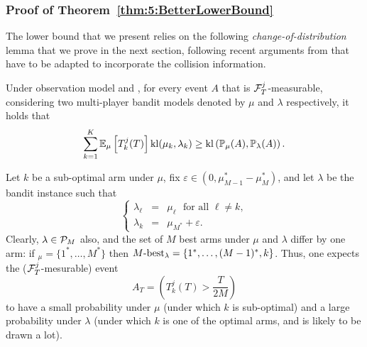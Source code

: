 \subsubsection{Proof of Theorem~\ref{thm:5:BetterLowerBound}}

The lower bound that we present relies on the following \emph{change-of-distribution} lemma that we prove in the next section, following recent arguments from \cite{Garivier16TrueShape} that have to be adapted to incorporate the collision information.


\begin{lemma}\label{lem:5:CD} Under observation model \modelun{} and \modeldeux, for every event $A$ that is $\mathcal{F}_{T}^{j}$-measurable, considering two multi-player bandit models denoted by $\mu$ and $\lambda$ respectively, it holds that
\begin{equation}
  \sum_{k=1}^{K}\mathbb{E}_{\mu}\left[T_k^j(T)\right]\mathrm{kl}(\mu_k,\lambda_k) \geq \mathrm{kl} \left(\mathbb{P}_{\mu}(A),\mathbb{P}_{\lambda}(A)\right).
\end{equation}
\end{lemma}

Let $k$ be a sub-optimal arm under $\mu$,
fix $\varepsilon \in \left(0, \mu_{M-1}^* - \mu_M^*\right)$,
and let $\lambda$ be the bandit instance such that
\[\left\{\begin{array}{ccl}
          \lambda_\ell & = & \mu_\ell \ \ \  \text{for all } \ell \neq k, \\
          \lambda_k & = & \mu_{M^*} + \varepsilon.
         \end{array}
\right.\]
Clearly, $\lambda\in\mathcal{P}_M$ also,
and the set of $M$ best arms under $\mu$ and $\lambda$ differ by one arm: if \Mbest$_{\mu} = \{1^*,\dots,M^*\}$ then $M\text{-}\mathrm{best}_{\lambda} = \{1^*,\dots,(M-1)^*,k\}$.
Thus, one expects the ($\mathcal{F}^j_T$-mesurable) event
\[A_T = \left(T_k^j(T) > \frac{T}{2M}\right)\]
to have a small probability under $\mu$ (under which $k$ is sub-optimal) and a large probability under $\lambda$ (under which $k$ is one of the optimal arms, and is likely to be drawn a lot).

